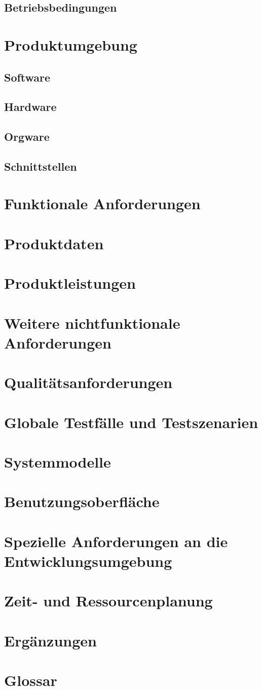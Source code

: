 \documentclass[a4paper,10pt]{article}
\begin{document}
\subsection{Betriebsbedingungen}
\section{Produktumgebung}
\subsection{Software}
\subsection{Hardware}
\subsection{Orgware}
\subsection{Schnittstellen}
\section{Funktionale Anforderungen}
\section{Produktdaten}
\section{Produktleistungen}
\section{Weitere nichtfunktionale Anforderungen}
\section{Qualitätsanforderungen}
\section{Globale Testfälle und Testszenarien}
\section{Systemmodelle}
\section{Benutzungsoberfläche}
\section{Spezielle Anforderungen an die Entwicklungsumgebung}
\section{Zeit- und Ressourcenplanung}
\section{Ergänzungen}
\section{Glossar}
\end{document}
